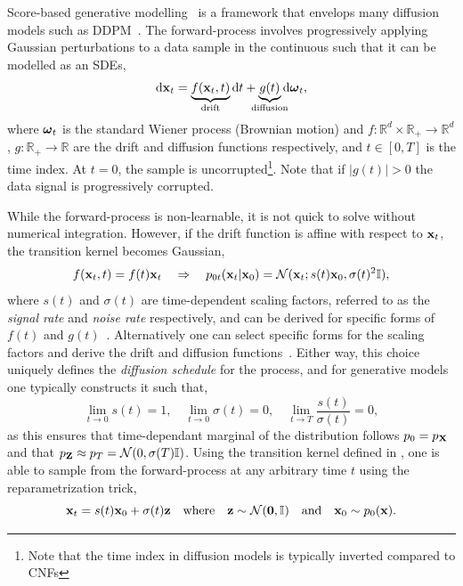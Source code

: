 Score-based generative modelling~\cite{ScoreMatching, ScoreBasedGenerativeModeling} is a framework that envelops many diffusion models such as DDPM~\cite{DDPM}.
The forward-process involves progressively applying Gaussian perturbations to a data sample in the continuous such that it can be modelled as an \Glspl{SDE},
\begin{equation}
    \label{eq:sde}
    \diff \x_t = \underbrace{f(\x_t, t)}_{\mathclap{\text{drift}}} \diff t + \underbrace{g(t)}_{\mathclap{\text{diffusion}}} \diff \w_t,
\end{equation}
where $\boldsymbol{\omega}_t$ is the standard Wiener process (Brownian motion) and $f: \mathbb{R}^d \times \mathbb{R}_{+} \rightarrow \mathbb{R}^d$, $g: \mathbb{R}_{+} \rightarrow \mathbb{R}$ are the drift and diffusion functions respectively, and $t \in [0, T]$ is the time index.
At $t=0$, the sample is uncorrupted\footnote{Note that the time index in diffusion models is typically inverted compared to \Glspl{CNF}}.
Note that if $|g(t)| > 0$ the data signal is progressively corrupted.

While the forward-process is non-learnable, it is not quick to solve without numerical integration.
However, if the drift function is affine with respect to $\mathbf{x}_t$, the transition kernel becomes Gaussian,
\begin{equation}
    \label{eq:gaussian_kernel}
    f(\mathbf{x}_t, t) = f(t)\mathbf{x}_t \quad \Rightarrow \quad p_{0t}(\mathbf{x}_t|\mathbf{x}_0) = \mathcal{N}(\mathbf{x}_t; s(t)\mathbf{x}_0, \sigma(t)^2 \mathbb{I}),
\end{equation}
where $s(t)$ and $\sigma(t)$ are time-dependent scaling factors, referred to as the \textit{signal rate} and \textit{noise rate} respectively, and can be derived for specific forms of $f(t)$ and $g(t)$~\cite{sarkka2019applied}.
Alternatively one can select specific forms for the scaling factors and derive the drift and diffusion functions~\cite{ElucidatingDesignSpace}.
Either way, this choice uniquely defines the \textit{diffusion schedule} for the process, and for generative models one typically constructs it such that,
\begin{equation}
    \label{eq:diffusion_schedule}
    \lim_{t \rightarrow 0} s(t) = 1, \quad \lim_{t \rightarrow 0} \sigma(t) = 0, \quad \lim_{t \rightarrow T} \frac{s(t)}{\sigma(t)} = 0,
\end{equation}
as this ensures that time-dependant marginal of the distribution follows $p_0 = p_{\mathbf{X}}$ and that $p_{\mathbf{Z}} \approx p_T = \mathcal{N}(0, \sigma(T) \mathbb{I})$.
Using the transition kernel defined in , one is able to sample from the forward-process at any arbitrary time $t$ using the reparametrization trick,
\begin{equation}
    \label{eq:reparametrization}
    \mathbf{x}_t = s(t)\mathbf{x}_0 + \sigma(t) \mathbf{z} \quad \text{where} \quad \mathbf{z} \sim \mathcal{N}(\mathbf{0}, \mathbb{I}) \quad \text{and} \quad \mathbf{x}_0 \sim p_0(\mathbf{x}).
\end{equation}

